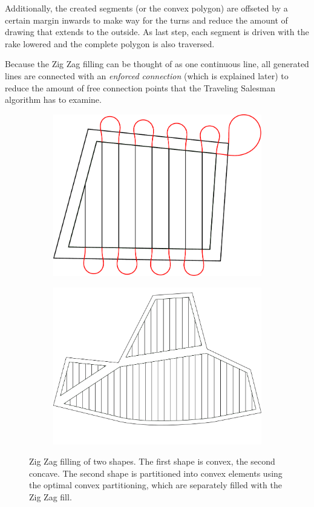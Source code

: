 Additionally, the created segments (or the convex polygon) are offseted by a certain margin inwards to make way for the turns and reduce the amount of drawing that extends to the outside. As last step, each segment is driven with the rake lowered and the complete polygon is also traversed.

Because the Zig Zag filling can be thought of as one continuous line, all generated lines are connected with an \textit{enforced connection} (which is explained later) to reduce the amount of free connection points that the Traveling Salesman algorithm has to examine.
\begin{figure}
\centering
\begin{subfigure}[b]{0.6\textwidth}
\includegraphics[width=\textwidth]{images/path_planning/zigzag_1.pdf}
\end{subfigure}
\par\bigskip
\begin{subfigure}[b]{0.9\textwidth}
\includegraphics[width=\textwidth]{images/path_planning/zigzag_2_wo_conn.pdf}
\end{subfigure}
\caption{Zig Zag filling of two shapes. The first shape is convex, the second concave. The second shape is partitioned into convex elements using the optimal convex partitioning, which are separately filled with the Zig Zag fill.}
\end{figure}


